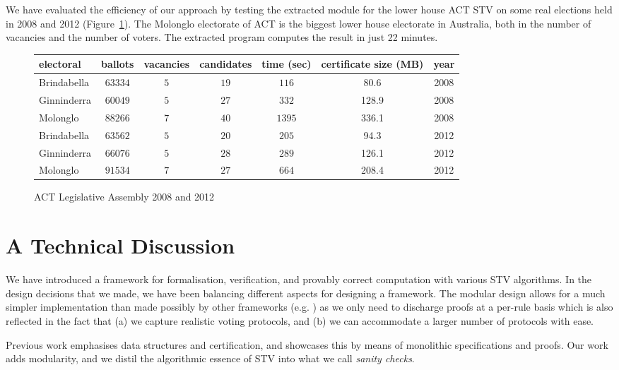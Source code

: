 \documentclass{llncs}
\begin{document}
 
 We have evaluated the efficiency of our approach by testing the
 extracted module for the lower house ACT STV on some real elections
 held in 2008
 and 2012 (Figure~\ref{ref;figure6}). The Molonglo
 electorate of ACT is the biggest lower house electorate in
 Australia, both in the number of vacancies and the number of voters. The extracted
 program computes the result in just 22 minutes.  \begin{small}
\begin{figure}[b]
\centering
\begin{tabular}{|l |c |c |c |c |c|c|}
\hline
electoral & ballots& vacancies& candidates& time (sec)& certificate size (MB)&year\\
\hline
Brindabella &$63334$&$5$&$19$&$116$&80.6&2008\\
Ginninderra &$60049$&$5$&$27$&$332$&128.9&2008\\
Molonglo &$88266$&$7$&$40$&$1395$&336.1&2008\\
Brindabella&$63562$&$5$&$20$&$205$&94.3&2012\\
Ginninderra&$66076$&$5$&$28$&$289$&126.1&2012\\
Molonglo&$91534$&$7$&$27$&$664$&208.4&2012\\
\hline
\end{tabular}
\caption{ACT Legislative Assembly 2008 and 2012}
\label{ref;figure6}
\end{figure}
\end{small}  
\section{A Technical Discussion}
We have introduced a framework for formalisation, verification,
and
provably correct computation with various STV algorithms. In the
design decisions that we made, 
we have been 
balancing different aspects for
designing a framework. The modular design allows for a much simpler
implementation than made possibly by other frameworks (e.g.
\cite{Ghale:2017:FVS}) as we only need to discharge proofs at a
per-rule basis which is also reflected in the fact that (a) we
capture realistic voting protocols, and (b) we can accommodate a
larger number of protocols with ease.
  

Previous work emphasises data structures and certification, and
showcases this by means of monolithic specifications and proofs. Our
work adds modularity,  and we distil the algorithmic essence of STV
into what we call \emph{sanity checks}.
\end{document}

